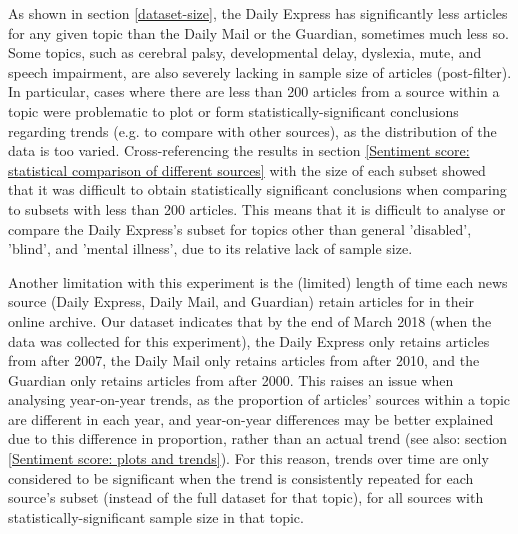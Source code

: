 \documentclass{report}
\newcommand{\textapprox}{\raisebox{0.5ex}{\texttildelow}}  %
\begin{document}
As shown in section \ref{dataset-size}, the Daily Express has significantly less articles for any given topic than the Daily Mail or the Guardian, sometimes much less so.
Some topics, such as cerebral palsy, developmental delay, dyslexia, mute, and speech impairment, are also severely lacking in sample size of articles (post-filter).
In particular, cases where there are less than \textapprox200 articles from a source within a topic were problematic to plot or form statistically-significant conclusions regarding trends (e.g. to compare with other sources), as the distribution of the data is too varied.
Cross-referencing the results in section \ref{Sentiment score: statistical comparison of different sources} with the size of each subset showed that it was difficult to obtain statistically significant conclusions when comparing to subsets with less than \textapprox200 articles.
This means that it is difficult to analyse or compare the Daily Express's subset for topics other than general 'disabled', 'blind', and 'mental illness', due to its relative lack of sample size.

Another limitation with this experiment is the (limited) length of time each news source (Daily Express, Daily Mail, and Guardian) retain articles for in their online archive.
Our dataset indicates that by the end of March 2018 (when the data was collected for this experiment), the Daily Express only retains articles from after \textapprox2007, the Daily Mail only retains articles from after \textapprox2010, and the Guardian only retains articles from after \textapprox2000. 
This raises an issue when analysing year-on-year trends, as the proportion of articles' sources within a topic are different in each year, and year-on-year differences may be better explained due to this difference in proportion, rather than an actual trend (see also: section \ref{Sentiment score: plots and trends}).
For this reason, trends over time are only considered to be significant when the trend is consistently repeated for each source's subset (instead of the full dataset for that topic), for all sources with statistically-significant sample size in that topic. 
\end{document}
